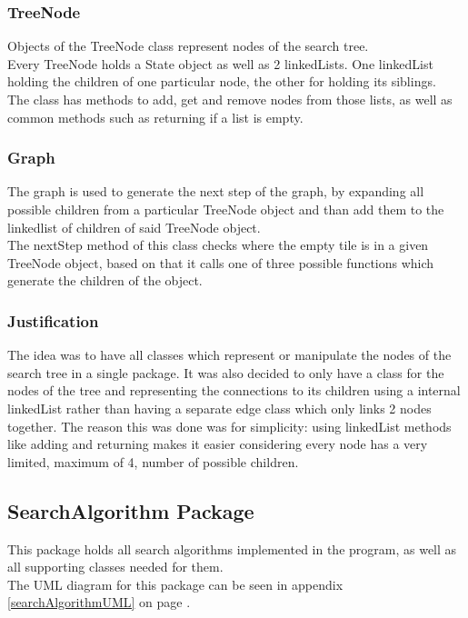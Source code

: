 \documentclass[journal]{IEEEtran}
\begin{document}
\subsubsection{TreeNode}
Objects of the TreeNode class represent nodes of the search tree. \\
Every TreeNode holds a State object as well as 2 linkedLists. One linkedList holding the children of one particular node, the other for holding its siblings. \\
The class has methods to add, get and remove nodes from those lists, as well as common methods such as returning if a list is empty. \\

\subsubsection{Graph}
The graph is used to generate the next step of the graph, by expanding all possible children from a particular TreeNode object and than add them to the linkedlist of children of said TreeNode object. \\
The nextStep method of this class checks where the empty tile is in a given TreeNode object, based on that it calls one of three possible functions which generate the children of the object. 

\subsubsection{Justification}
The idea was to have all classes which represent or manipulate the nodes of the search tree in a single package. It was also decided to only have a class for the nodes of the tree and representing the connections to its children using a internal linkedList rather than having a separate edge class which only links 2 nodes together. The reason this was done was for simplicity: using linkedList methods like adding and returning makes it easier considering every node has a very limited, maximum of 4, number of possible children. 

\subsection{SearchAlgorithm Package}\label{sec:searchAlgorithmPackage}
This package holds all search algorithms implemented in the program, as well as all supporting classes needed for them. \\
The UML diagram for this package can be seen in appendix \ref{searchAlgorithmUML} on page \pageref{searchAlgorithmUML}. \\
\end{document}
